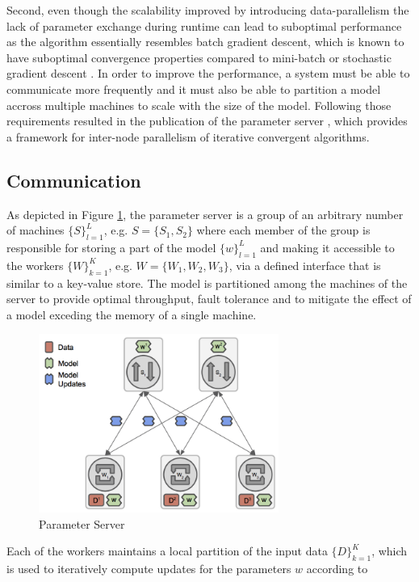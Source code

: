 Second, even though the scalability improved by introducing data-parallelism the lack of parameter exchange during runtime can lead to suboptimal performance \cite{xing2015strategies} as the algorithm essentially resembles batch gradient descent, which is known to have suboptimal convergence properties compared to mini-batch or stochastic gradient descent \cite{bottou2010large} \cite{smith2016cocoa}.
In order to improve the performance, a system must be able to communicate more frequently and it must also be able to partition a model accross multiple machines to scale with the size of the model.
Following those requirements resulted in the publication of the parameter server \cite{li2014scaling}, which provides a framework for inter-node parallelism of iterative convergent algorithms.

\subsection{Communication}
As depicted in Figure \ref{fig:param_server}, the parameter server is a group of an arbitrary number of machines $\{S\}_{l=1}^L$, e.g. $S = \{S_1, S_2\}$ where each member of the group is responsible for storing a part of the model $\{w\}_{l=1}^L$ and making it accessible to the workers $\{W\}_{k=1}^K$, e.g. $W = \{W_1, W_2, W_3\}$, via a defined interface that is similar to a key-value store.
The model is partitioned among the machines of the server to provide optimal throughput, fault tolerance and to mitigate the effect of a model exceding the memory of a single machine.
\begin{figure}[h]
\centering
\includegraphics[width=0.7\textwidth]{img/param_server.png}
\caption{Parameter Server}
\label{fig:param_server}
\end{figure}
Each of the workers maintains a local partition of the input data $\{D\}_{k=1}^K$, which is used to iteratively compute updates for the parameters $w$ according to

